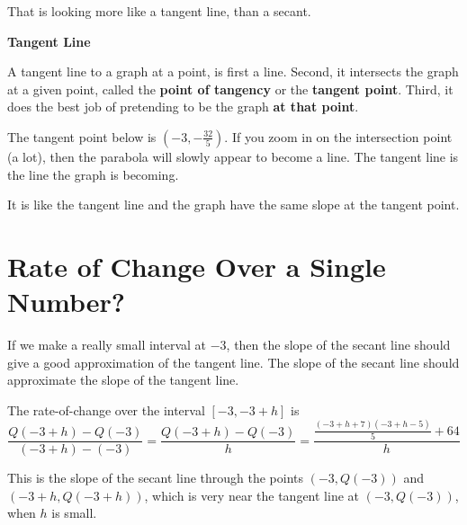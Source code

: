 \documentclass{ximera}
\begin{document}
That is looking more like a tangent line, than a secant.





\begin{idea}
\textbf{\textcolor{blue!55!black}{Tangent Line}}

A tangent line to a graph at a point, is first a line. Second, it intersects the graph at a given point, called the \textbf{point of tangency} or the \textbf{tangent point}. Third, it does the best job of pretending to be the graph \textbf{\textcolor{red!70!darkgray}{at that point}}. 




The tangent point below is $\left( -3, -\frac{32}{5} \right)$. If you zoom in on the intersection point (a lot), then the parabola will slowly appear to become a line. The tangent line is the line the graph is becoming. 






\begin{center}
\end{center}



It is like the tangent line and the graph have the same slope at the tangent point.

\end{idea}










\section*{Rate of Change Over a Single Number?}





If we make a really small interval at $-3$, then the slope of the secant line should give a good approximation of the tangent line.  The slope of the secant line should approximate the slope of the tangent line.




The rate-of-change over the interval $[-3, -3+h]$ is 
\[  \frac{Q(-3+h)-Q(-3)}{(-3+h)-(-3)} = \frac{Q(-3+h)-Q(-3)}{h} =  \frac{\frac{(-3+h+7)(-3+h-5)}{5}+64}{h}   \]


This is the slope of the secant line through the points $(-3, Q(-3))$ and $(-3+h, Q(-3+h))$, which is very near the tangent line at $(-3, Q(-3))$, when $h$ is small.
\end{document}
